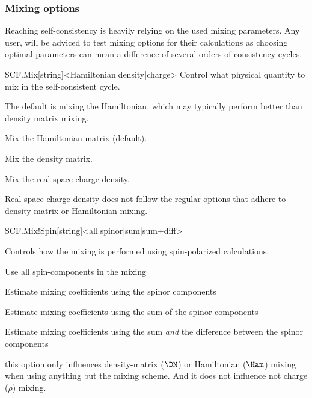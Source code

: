 \subsubsection{Mixing options}

Reaching self-consistency is heavily relying on the used mixing
parameters.
Any user, will be adviced to test mixing options for their
calculations as choosing optimal parameters can mean a difference of
several orders of consistency cycles. 


\begin{fdfentry}{SCF.Mix}[string]<Hamiltonian|density|charge>
  Control what physical quantity to mix in the self-consistent cycle.

  The default is mixing the Hamiltonian, which may typically perform
  better than density matrix mixing. 

  \begin{fdfoptions}
    \option[Hamiltonian]%
    Mix the Hamiltonian matrix (default).

    \option[density]%
    Mix the density matrix.

    \option[charge]%
    Mix the real-space charge density.
    
  \end{fdfoptions}
  
  \note Real-space charge density does not follow the regular options
  that adhere to density-matrix or Hamiltonian mixing.

\end{fdfentry}

\begin{fdfentry}{SCF.Mix!Spin}[string]<all|spinor|sum|sum+diff>

  Controls how the mixing is performed using spin-polarized
  calculations. 
  
  \begin{fdfoptions}
    \option[all] %
    Use all spin-components in the mixing

    \option[spinor] %
    Estimate mixing coefficients using the spinor components

    \option[sum] %
    Estimate mixing coefficients using the sum of the spinor
    components 

    Estimate mixing coefficients using the sum \emph{and} the
    difference between the spinor components 
  \end{fdfoptions}

  \note this option only influences density-matrix ($\DM$) or
  Hamiltonian ($\Ham$) mixing when using anything but the
   mixing scheme. And it does not influence not charge
  ($\rho$) mixing.
  
\end{fdfentry}

